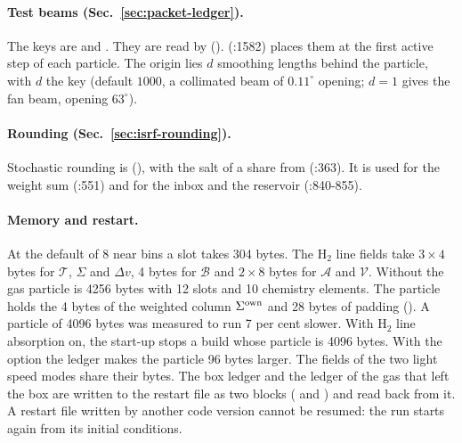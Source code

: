 \paragraph{Test beams (Sec.~\ref{sec:packet-ledger}).} The keys are
 and . They are read
by  ().
 (:1582) places them at the first
active step of each particle. The origin lies $d$ smoothing lengths behind the
particle, with $d$ the key 
(default $1000$, a collimated beam of $0.11^\circ$ opening; $d=1$ gives the
fan beam, opening $63^\circ$).

\paragraph{Rounding (Sec.~\ref{sec:isrf-rounding}).} Stochastic rounding is
 (),
with the salt of a share from  (:363). It
is used for the weight sum (:551) and for the inbox and the reservoir
(:840-855).

\paragraph{Memory and restart.} At the default of 8 near bins a slot takes
304 bytes. The H$_2$ line fields take $3\times4$ bytes for $\mathcal T$,
$\Sigma$ and $\Delta v$, 4 bytes for $\mathcal B$ and $2\times8$ bytes for
$\mathcal A$ and $\mathcal V$. Without
 the gas particle is 4256 bytes with 12
slots and 10 chemistry elements. The particle holds the 4 bytes
of the weighted column $\Sigma^{\rm own}$ and 28 bytes of padding
(). A particle of 4096 bytes was measured to
run 7 per cent slower. With H$_2$ line absorption on, the start-up stops a build
whose particle is 4096 bytes. With the option the ledger makes the particle 96
bytes larger. The fields of the two light speed modes
share their bytes. The box ledger and the ledger of the gas that left the box
are written to the restart file as two blocks ( and
) and read back from it. A restart file written
by another code version cannot be resumed: the run starts again from its
initial conditions.
